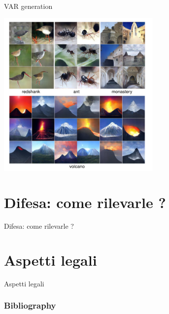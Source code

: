 \documentclass[11pt]{beamer}
\begin{document}
\begin{frame}{VAR generation \cite{nguyen2017plug}}
\begin{center}
\includegraphics[width=0.6\textwidth]{Pic/GAN_example.png}
\end{center}
\end{frame}


\section{Difesa: come rilevarle ?}

\begin{frame}
\begin{center}
\Huge
Difesa: come rilevarle ?
\end{center}
\end{frame}


\section{Aspetti legali}

\begin{frame}
\begin{center}
\Huge
Aspetti legali
\end{center}
\end{frame}





\begin{frame}[t,allowframebreaks]
\frametitle{Bibliography}
\printbibliography
\end{frame}
\end{document}
